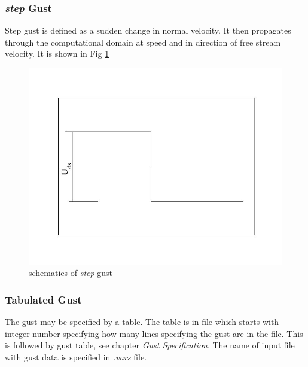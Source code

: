 \subsubsection{\emph{step} Gust}
Step gust is defined as a sudden change in normal velocity. It then propagates through the computational domain 
at speed and in direction of free stream velocity.
It is shown in Fig \ref{step}
\begin{figure}[htbp]
  \centering\includegraphics[clip,width=.5\textwidth]{Figures/step.jpg}
\caption{schematics of \emph{step} gust}\label{step}
\end{figure}

\subsubsection{Tabulated Gust}
The gust may be specified by a table. The table is in file which starts with integer number specifying how many 
lines specifying the gust are in the file. This is followed by gust table, see chapter \emph{Gust Specification}.
The name of input file with gust data is specified in \emph{.vars} file.

